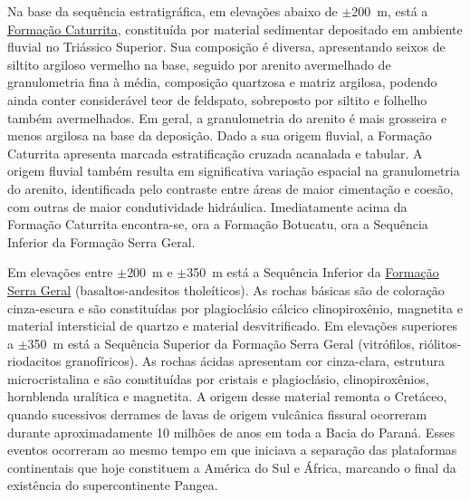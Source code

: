 Na base da sequência estratigráfica, em elevações abaixo de $\pm$200~m, está a \href{http://pt.wikipedia.org/wiki/Forma\%C3\%A7\%C3\%A3o_Caturrita}{Formação Caturrita}, constituída por material sedimentar depositado em ambiente fluvial no Triássico Superior. Sua composição é diversa, apresentando seixos de siltito argiloso vermelho na base, seguido por arenito avermelhado de granulometria fina à média, composição quartzosa e matriz argilosa, podendo ainda conter considerável teor de feldspato, sobreposto por siltito e folhelho também avermelhados. Em geral, a granulometria do arenito é mais grosseira e menos argilosa na base da deposição. Dado a sua origem fluvial, a Formação Caturrita apresenta marcada estratificação cruzada acanalada e tabular. A origem fluvial também resulta em significativa variação espacial na granulometria do arenito, identificada pelo contraste entre áreas de maior cimentação e coesão, com outras de maior condutividade hidráulica. Imediatamente acima da Formação Caturrita encontra-se, ora a Formação Botucatu, ora a Sequência Inferior da Formação Serra Geral.


Em elevações entre $\pm$200~m e $\pm$350~m está a Sequência Inferior da \href{http://pt.wikipedia.org/wiki/Forma\%C3\%A7\%C3\%A3o_Serra_Geral}{Formação Serra Geral} (basaltos-andesitos tholeíticos). As rochas básicas são de coloração cinza-escura e são constituídas por plagioclásio cálcico clinopiroxênio, magnetita e material intersticial de quartzo e material desvitrificado. Em elevações superiores a $\pm$350~m está a Sequência Superior da Formação Serra Geral (vitrófilos, riólitos-riodacitos granofíricos). As rochas ácidas apresentam cor cinza-clara, estrutura microcristalina e são constituídas por cristais e plagioclásio, clinopiroxênios, hornblenda uralítica e magnetita. A origem desse material remonta o Cretáceo, quando sucessivos derrames de lavas de origem vulcânica fissural ocorreram durante aproximadamente 10 milhões de anos em toda a Bacia do Paraná. Esses eventos ocorreram ao mesmo tempo em que iniciava a separação das plataformas continentais que hoje constituem a América do Sul e África, marcando o final da existência do supercontinente Pangea.

